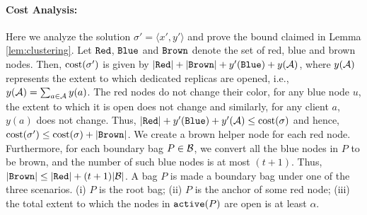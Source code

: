 \documentclass[11pt]{article}
\newcommand{\mysmallpara}[1] {\paragraph{#1:}}
\newcommand{\myactive} {{\tt active}}
\newcommand{\calA} {{\cal A}}
\newcommand{\pair}[2] {\langle #1, #2\rangle}
\newcommand{\myred} {{\tt Red}}
\newcommand{\myblue} {{\tt Blue}}
\newcommand{\mybrown} {{\tt Brown}}
\newcommand{\cost} {{\rm cost}}
\newcommand{\calB} {{\cal B}}
\begin{document}
\mysmallpara{Cost Analysis}
Here we analyze the solution $\sigma'=\pair{x'}{y'}$ and prove the bound claimed in Lemma \ref{lem:clustering}.
Let $\myred$, $\myblue$ and $\mybrown$ denote the set of red, blue and brown nodes.
Then, $\cost(\sigma')$ is given by $|\myred|+|\mybrown| + y'(\myblue) + y(\calA)$,
where $y(\calA)$ represents the extent to which dedicated replicas are opened, 
i.e., $y(\calA) = \sum_{a\in \calA} y(a)$.
The red nodes do not change their color, for any blue node $u$,
the extent to which it is open does not change and similarly, for any client $a$, $y(a)$ does not change.
Thus, $|\myred| + y'(\myblue) + y'(\calA) \leq \cost(\sigma)$
and hence, $\cost(\sigma') \leq \cost(\sigma) + |\mybrown|$.
We create a brown helper node for each red node.
Furthermore, for each boundary bag $P\in \calB$, we convert all the blue nodes in $P$ to be brown,
and the number of such blue nodes is at most $(t+1)$. 
Thus,  $|\mybrown| \leq |\myred| + (t+1)|\calB|$. 
A bag $P$ is made a boundary bag under one of the three scenarios. 
(i) $P$ is the root bag; (ii) $P$ is the anchor of some red node;
(iii) the total extent to which the nodes in $\myactive(P)$ are open is at least $\alpha$.
\end{document}
